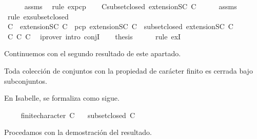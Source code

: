 \begin{isabellebody}
\ \ \ \ \isamarkupfalse%
\ assms\ \isamarkupfalse%
\ {\isacharparenleft}rule\ ex{}{\isacharunderscore}pcp{\isacharparenright}\isanewline
\ \ \isamarkupfalse%
\ C{}{\isacharcolon}{\isachardoublequoteopen}subset{\isacharunderscore}closed\ {\isacharparenleft}extensionSC\ C{\isacharparenright}{\isachardoublequoteclose}\isanewline
\ \ \ \ \isamarkupfalse%
\ assms\ \isamarkupfalse%
\ {\isacharparenleft}rule\ ex{}{\isacharunderscore}subset{\isacharunderscore}closed{\isacharparenright}\isanewline
\ \ \isamarkupfalse%
\ {\isachardoublequoteopen}C\ {\isasymsubseteq}\ {\isacharparenleft}extensionSC\ C{\isacharparenright}\ {\isasymand}\ pcp\ {\isacharparenleft}extensionSC\ C{\isacharparenright}\ {\isasymand}\ subset{\isacharunderscore}closed\ {\isacharparenleft}extensionSC\ C{\isacharparenright}{\isachardoublequoteclose}\ \isanewline
\ \ \ \ \isamarkupfalse%
\ C{}\ C{}\ C{}\ \isamarkupfalse%
\ {\isacharparenleft}iprover\ intro{\isacharcolon}\ conjI{\isacharparenright}\isanewline
\ \ \isamarkupfalse%
\ {\isacharquery}thesis\isanewline
\ \ \ \ \isamarkupfalse%
\ {\isacharparenleft}rule\ exI{\isacharparenright}\isanewline
{}\isamarkupfalse%
%
\endisatagproof
{\isafoldproof}%
%
\isadelimproof
%
\endisadelimproof
%
\begin{isamarkuptext}%
Continuemos con el segundo resultado de este apartado.

  \begin{lema}
  Toda colección de conjuntos con la propiedad de carácter finito es cerrada bajo subconjuntos.
  \end{lema}

  En Isabelle, se formaliza como sigue.%
\end{isamarkuptext}\isamarkuptrue%
\isamarkupfalse%
\ \isanewline
\ \ \ {\isachardoublequoteopen}finite{\isacharunderscore}character\ C{\isachardoublequoteclose}\isanewline
\ \ \ {\isachardoublequoteopen}subset{\isacharunderscore}closed\ C{\isachardoublequoteclose}\isanewline
%
\isadelimproof
\ \ %
\endisadelimproof
%
\isatagproof
{}\isamarkupfalse%
%
\endisatagproof
{\isafoldproof}%
%
\isadelimproof
%
\endisadelimproof
%
\begin{isamarkuptext}%
Procedamos con la demostración del resultado.


\end{isamarkuptext}
\end{isabellebody}
